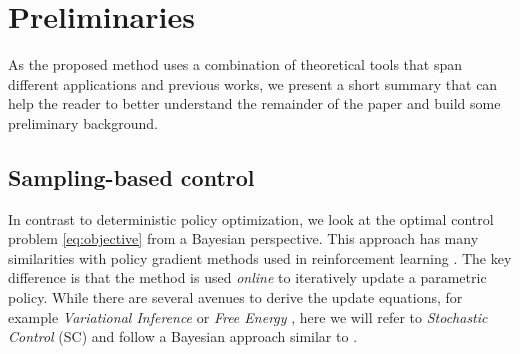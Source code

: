 \section{Preliminaries} \label{sec:theory}

As the proposed method uses a combination of theoretical tools that span different applications and previous works, we present a short summary that can help the reader to better understand the remainder of the paper and build some preliminary background.

\subsection{Sampling-based control}
In contrast to deterministic policy optimization, we look at the optimal control problem \eqref{eq:objective} from a Bayesian perspective. This approach has many similarities with policy gradient methods used in reinforcement learning \cite{williams1992simple}. The key difference is that the method is used \emph{online} to iteratively update a parametric policy. While there are several avenues to derive the update equations, for example \emph{Variational Inference} \cite{lambert_stein_2020} or \emph{Free Energy} \cite{williams_information_2017}, here we will refer to \emph{Stochastic Control} (SC) and follow a Bayesian approach similar to \cite{levine2018reinforcement}. 

